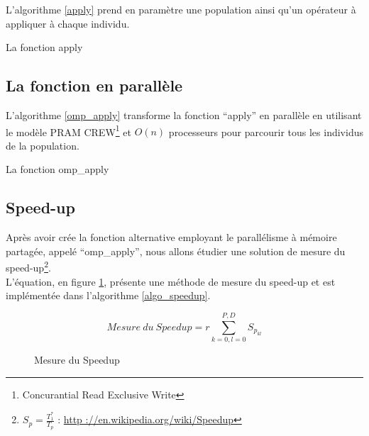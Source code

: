 L'algorithme \ref{apply} prend en paramètre une population ainsi qu'un opérateur à appliquer à chaque individu.

\incmargin{1em}
\begin{algorithm}[here]
  \dontprintsemicolon
  \caption{La fonction apply}
  \label{apply}
\end{algorithm}
\decmargin{1em}

\subsection{La fonction en parallèle}

L'algorithme \ref{omp_apply} transforme la fonction ``apply'' en parallèle en utilisant le modèle PRAM CREW\footnote{Concurantial Read Exclusive Write} et $O(n)$ processeurs pour parcourir tous les individus de la population.

\incmargin{1em}
\begin{algorithm}[here]
  \dontprintsemicolon
  \caption{La fonction omp\_apply}
  \label{omp_apply}
\end{algorithm}
\decmargin{1em}

\subsection{Speed-up}

Après avoir crée la fonction alternative employant le parallélisme à mémoire partagée, appelé ``omp\_apply'', nous allons étudier une solution de mesure du speed-up\footnote{$S_p = \frac{T_1^*}{T_p}$ : \url{http ://en.wikipedia.org/wiki/Speedup}}.\\

L'équation, en figure \ref{fig:mesure_speedup}, présente une méthode de mesure du speed-up et est implémentée dans l'algorithme \ref{algo_speedup}.

\begin{figure}[here]
\centering
$$Mesure\ du\ Speedup = r \sum^{P,D}_{k=0,l=0} S_{p_{kl}}$$
\caption{Mesure du Speedup}
\label{fig:mesure_speedup}
\end{figure}

